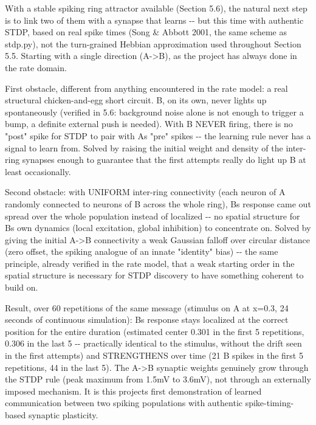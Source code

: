\documentclass[
  english,
]{article}
\begin{document}
With a stable spiking ring attractor available (Section 5.6), the natural next step is to link two of them with a synapse that learns -\/- but this time with authentic STDP, based on real spike times (Song \& Abbott 2001, the same scheme as stdp.py), not the turn-grained Hebbian approximation used throughout Section 5.5. Starting with a single direction (A-\textgreater B), as the project has always done in the rate domain.

First obstacle, different from anything encountered in the rate model: a real structural chicken-and-egg short circuit. B, on its own, never lights up spontaneously (verified in 5.6: background noise alone is not enough to trigger a bump, a definite external push is needed). With B NEVER firing, there is no "post" spike for STDP to pair with A\textquotesingle s "pre" spikes -\/- the learning rule never has a signal to learn from. Solved by raising the initial weight and density of the inter-ring synapses enough to guarantee that the first attempts really do light up B at least occasionally.

Second obstacle: with UNIFORM inter-ring connectivity (each neuron of A randomly connected to neurons of B across the whole ring), B\textquotesingle s response came out spread over the whole population instead of localized -\/- no spatial structure for B\textquotesingle s own dynamics (local excitation, global inhibition) to concentrate on. Solved by giving the initial A-\textgreater B connectivity a weak Gaussian falloff over circular distance (zero offset, the spiking analogue of an innate "identity" bias) -\/- the same principle, already verified in the rate model, that a weak starting order in the spatial structure is necessary for STDP discovery to have something coherent to build on.

Result, over 60 repetitions of the same message (stimulus on A at x=0.3, 24 seconds of continuous simulation): B\textquotesingle s response stays localized at the correct position for the entire duration (estimated center 0.301 in the first 5 repetitions, 0.306 in the last 5 -\/- practically identical to the stimulus, without the drift seen in the first attempts) and STRENGTHENS over time (21 B spikes in the first 5 repetitions, 44 in the last 5). The A-\textgreater B synaptic weights genuinely grow through the STDP rule (peak maximum from 1.5mV to 3.6mV), not through an externally imposed mechanism. It is this project\textquotesingle s first demonstration of learned communication between two spiking populations with authentic spike-timing-based synaptic plasticity.
\end{document}
